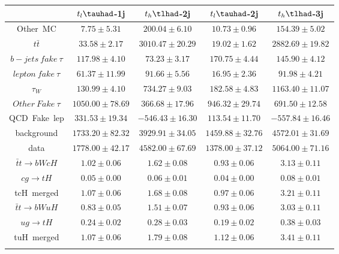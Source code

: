 \centering
\begin{tabular}{ccccc} \toprule\toprule
 & $t_{l}\tauhad$-1j & $t_{h}\tlhad$-2j & $t_{l}\tauhad$-2j & $t_{h}\tlhad$-3j\\\midrule
Other~MC & $7.75\pm5.31$ & $200.04\pm6.10$ & $10.73\pm0.96$ & $154.39\pm5.02$\\
$t\bar{t}$ & $33.58\pm2.17$ & $3010.47\pm20.29$ & $19.02\pm1.62$ & $2882.69\pm19.82$\\
$b-jets~fake~\tau$ & $117.98\pm4.10$ & $73.23\pm3.17$ & $170.75\pm4.44$ & $145.90\pm4.12$\\
$lepton~fake~\tau$ & $61.37\pm11.99$ & $91.66\pm5.56$ & $16.95\pm2.36$ & $91.98\pm4.21$\\
$\tau_{W}$ & $130.99\pm4.10$ & $734.27\pm9.03$ & $182.58\pm4.83$ & $1163.40\pm11.07$\\
$Other~Fake~\tau$ & $1050.00\pm78.69$ & $366.68\pm17.96$ & $946.32\pm29.74$ & $691.50\pm12.58$\\
QCD~Fake~lep & $331.53\pm19.34$ & $-546.43\pm16.30$ & $113.54\pm11.70$ & $-557.84\pm16.46$\\
background & $1733.20\pm82.32$ & $3929.91\pm34.05$ & $1459.88\pm32.76$ & $4572.01\pm31.69$\\
data & $1778.00\pm42.17$ & $4582.00\pm67.69$ & $1378.00\pm37.12$ & $5064.00\pm71.16$\\
$\bar{t}t\to bWcH$ & $1.02\pm0.06$ & $1.62\pm0.08$ & $0.93\pm0.06$ & $3.13\pm0.11$\\
$cg\to tH$ & $0.05\pm0.00$ & $0.06\pm0.01$ & $0.04\pm0.00$ & $0.08\pm0.01$\\
tcH~merged & $1.07\pm0.06$ & $1.68\pm0.08$ & $0.97\pm0.06$ & $3.21\pm0.11$\\
$\bar{t}t\to bWuH$ & $0.83\pm0.05$ & $1.51\pm0.07$ & $0.93\pm0.06$ & $3.03\pm0.11$\\
$ug\to tH$ & $0.24\pm0.02$ & $0.28\pm0.03$ & $0.19\pm0.02$ & $0.38\pm0.03$\\
tuH~merged & $1.07\pm0.06$ & $1.79\pm0.08$ & $1.12\pm0.06$ & $3.41\pm0.11$\\
\bottomrule\bottomrule\\
\end{tabular}
